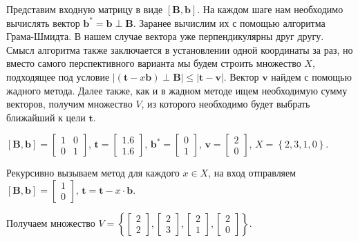 Представим входную матрицу в виде $ \left[\mathbf{B}, \mathbf{b}\right] $. На каждом шаге нам необходимо вычислять вектор $ \mathbf{b}^* = \mathbf{b} \perp \mathbf{B} $. Заранее вычислим их с помощью алгоритма Грама-Шмидта. В нашем случае вектора уже перпендикулярны друг другу. Смысл алгоритма также заключается в установлении одной координаты за раз, но вместо самого перспективного варианта мы будем строить множество $ X $, подходящее под условие $ |(\mathbf{t} - x\mathbf{b}) \perp \mathbf{B} | \leq | \mathbf{t} - \mathbf{v} | $. Вектор $ \mathbf{v} $ найдем с помощью жадного метода. Далее также, как и в жадном методе ищем необходимую сумму векторов, получим множество $ V $, из которого необходимо будет выбрать ближайший к цели $ \mathbf{t} $.

$ \left[\mathbf{B}, \mathbf{b}\right] = \left[\begin{array}{cccc}
1 & 0\\
0 & 1
\end{array}\right] $, $ \mathbf{t} = \left[\begin{array}{cccc}
1.6 \\
1.6
\end{array}\right] $, $ \mathbf{b}^* = \left[\begin{array}{cccc}
0 \\
1
\end{array}\right] $, $ \mathbf{v} = \left[\begin{array}{cccc}
2 \\ 
0
\end{array}\right] $, $ X = \left\lbrace 2, 3, 1, 0 \right\rbrace $.

Рекурсивно вызываем метод для каждого $ x \in X $, на вход отправляем $ \left[\mathbf{B}, \mathbf{b}\right] = \left[\begin{array}{cccc}
1 \\
0
\end{array}\right] $, $ \mathbf{t} = \mathbf{t} - x \cdot \mathbf{b} $.

Получаем множество $ V = \left\lbrace \left[\begin{array}{cccc}
2 \\
2
\end{array}\right], \left[\begin{array}{cccc}
2 \\
3
\end{array}\right], \left[\begin{array}{cccc}
2 \\
1
\end{array}\right], \left[\begin{array}{cccc}
2 \\
0
\end{array}\right] \right\rbrace$.

